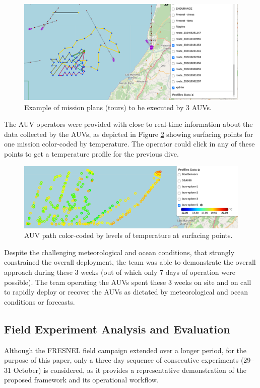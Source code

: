 \begin{figure}
    \centering
    \includegraphics[width=.7\linewidth]{fig/missionplans.png}
    \caption{Example of mission plans (tours) to be executed by 3 AUVs.}
    \label{fig:missionplans}
\end{figure}


The AUV operators were provided with close to real-time information
about the data collected by the AUVs, as depicted in Figure
\ref{fig:temperatureprofiles} showing surfacing points for one mission
color-coded by temperature. The operator could click in any of these
points to get a temperature profile for the previous dive.

 \begin{figure}
    \centering
    \includegraphics[width=.7\linewidth]{fig/temperatureprofiles.png}
    \caption{AUV path color-coded by levels of temperature at surfacing points.}
    \label{fig:temperatureprofiles}
\end{figure}



Despite the challenging meteorological and ocean conditions, that
strongly constrained the overall deployment, the \proj team was able to
demonstrate the overall approach during these 3 weeks (out of which only
7 days of operation were possible). The team operating the AUVs spent
these 3 weeks on site and on call to rapidly deploy or recover the AUVs
as dictated by meteorological and ocean conditions or forecasts.



\subsection{Field Experiment Analysis and Evaluation}

Although the FRESNEL field campaign extended over a longer period, for the purpose of this paper, only a three-day sequence of consecutive experiments (29–31 October) is considered, as it provides a representative demonstration of the proposed framework and its operational workflow.

